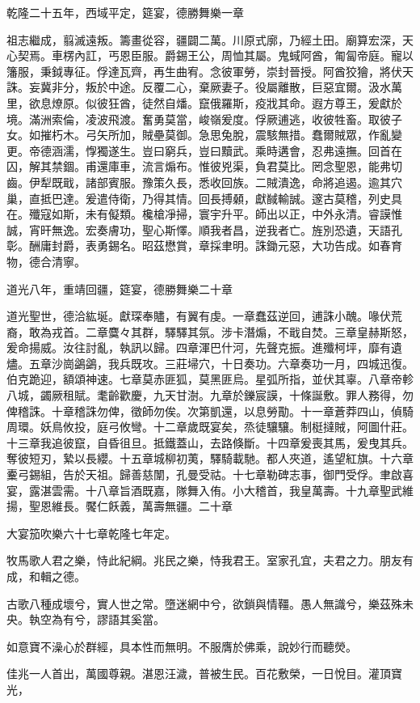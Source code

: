 \begin{pinyinscope}
乾隆二十五年，西域平定，筵宴，德勝舞樂一章

祖志繼成，翦滅遠叛。籌畫從容，疆闢二萬。川原式廓，乃經土田。廟算宏深，天心契焉。車楞內訌，丐恩臣服。爵錫王公，周恤其屬。鬼蜮阿酋，匍匐帝庭。寵以籓服，秉鉞專征。俘達瓦齊，再生曲宥。念彼軍勞，崇封晉授。阿酋狡獪，將伏天誅。妄冀非分，叛於中途。反覆二心，棄厥妻子。役屬離散，巨惡宜爾。汲水萬里，欲息燎原。似彼狂酋，徒然自燔。竄俄羅斯，疫戕其命。遐方尊王，爰獻於境。滿洲索倫，凌波飛渡。奮勇莫當，峻嶺爰度。俘厥逋逃，收彼牲畜。取彼子女。如摧朽木。弓矢所加，賊壘莫御。急思兔脫，震駭無措。蠢爾賊眾，作亂變更。帝德涵濡，惸獨遂生。豈曰窮兵，豈曰黷武。乘時遘會，忍弗遠撫。回首在囚，解其禁錮。甫還庫車，流言煽布。惟彼兇渠，負君莫比。罔念聖恩，能弗切齒。伊犁既戢，諸部賓服。豫策久長，悉收回族。二賊潰逸，命將追遏。逾其穴巢，直抵巴達。爰遣侍衛，乃得其情。回長搏顙，獻馘輸誠。邃古莫稽，列史具在。殲寇如斯，未有儗類。欃槍凈掃，寰宇升平。師出以正，中外永清。睿謨惟誠，宵旰無逸。宏奏膚功，聖心斯懌。順我者昌，逆我者亡。旌別恐遺，天語孔彰。酬庸封爵，表勇錫名。昭茲懋賞，章採聿明。誅鋤元惡，大功告成。如春育物，德合清寧。

道光八年，重靖回疆，筵宴，德勝舞樂二十章

道光聖世，德洽紘埏。獻琛奉贐，有翼有虔。一章蠢茲逆回，逋誅小醜。喙伏荒裔，敢為戎首。二章麌々其群，驛驛其氛。涉卡潛煽，不戢自焚。三章皇赫斯怒，爰命揚威。汝往討亂，執訊以歸。四章渾巴什河，先聲克振。進殲柯坪，靡有遺燼。五章沙崗鷁鷁，我兵既攻。三莊埽穴，十日奏功。六章奏功一月，四城迅復。伯克跪迎，額頌神速。七章莫赤匪狐，莫黑匪烏。星弧所指，並伏其辜。八章帝軫八城，蠲厥租賦。耄齡歡慶，九天甘澍。九章於鑠宸謨，十條誕敷。罪人務得，勿俾稽誅。十章稽誅勿俾，徵師勿俟。次第凱還，以息勞勩。十一章蒼莽四山，偵騎周環。妖鳥攸投，庭弓攸彎。十二章歲既宴矣，烝徒驤驤。制梃撻賊，阿圖什莊。十三章我追彼竄，自昏徂旦。抵鐵蓋山，去路倏斷。十四章爰喪其馬，爰曳其兵。奪彼短刃，縶以長纓。十五章城柳初荑，驛騎載馳。都人夾道，遙望紅旗。十六章櫜弓錫組，告於天祖。歸善慈闈，孔曼受祜。十七章勒碑志事，御門受俘。聿啟喜宴，露湛雲需。十八章旨酒既嘉，隊舞入侑。小大稽首，我皇萬壽。十九章聖武維揚，聖恩維長。饜仁飫義，萬壽無疆。二十章

大宴笳吹樂六十七章乾隆七年定。

牧馬歌人君之樂，恃此紀綱。兆民之樂，恃我君王。室家孔宜，夫君之力。朋友有成，和輯之德。

古歌八種成壞兮，實人世之常。墮迷網中兮，欲鎖與情韁。愚人無識兮，樂茲殊未央。執空為有兮，謬語其奚當。

如意寶不澡心於群經，具本性而無明。不服膺於佛乘，說妙行而聽熒。

佳兆一人首出，萬國尊親。湛恩汪濊，普被生民。百花敷榮，一日悅目。灌頂寶光，


\end{pinyinscope}
